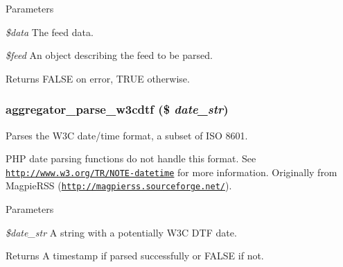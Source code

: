 \begin{DoxyParams}{Parameters}
\item[{\em \$data}]The feed data. \item[{\em \$feed}]An object describing the feed to be parsed.\end{DoxyParams}
\begin{DoxyReturn}{Returns}
FALSE on error, TRUE otherwise. 
\end{DoxyReturn}
\hypertarget{aggregator_8parser_8inc_a7d916aee83570a3a7317d7cd1d7190bb}{
\subsubsection[{aggregator\_\-parse\_\-w3cdtf}]{\setlength{\rightskip}{0pt plus 5cm}aggregator\_\-parse\_\-w3cdtf (\$ {\em date\_\-str})}}
\label{aggregator_8parser_8inc_a7d916aee83570a3a7317d7cd1d7190bb}
Parses the W3C date/time format, a subset of ISO 8601.

PHP date parsing functions do not handle this format. See \href{http://www.w3.org/TR/NOTE-datetime}{\tt http://www.w3.org/TR/NOTE-\/datetime} for more information. Originally from MagpieRSS (\href{http://magpierss.sourceforge.net/}{\tt http://magpierss.sourceforge.net/}).


\begin{DoxyParams}{Parameters}
\item[{\em \$date\_\-str}]A string with a potentially W3C DTF date.\end{DoxyParams}
\begin{DoxyReturn}{Returns}
A timestamp if parsed successfully or FALSE if not. 
\end{DoxyReturn}
